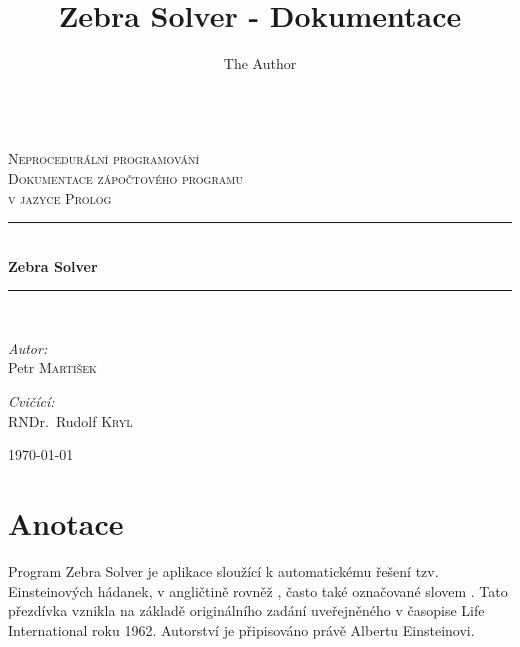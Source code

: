 \documentclass[11pt]{article} %
\title{Zebra Solver - Dokumentace}
\author{The Author}
\date{} %
\begin{document}
\newcommand{\HRule}{\rule{\linewidth}{0.5mm}}
\begin{titlepage}
\begin{center}


~\\[3cm]

\textsc{\LARGE Neprocedurální programování}\\[1.5cm]

\textsc{\Large Dokumentace zápočtového programu \\ v jazyce Prolog}\\[1cm]

\HRule \\ [0.6cm]
{ \huge \bfseries Zebra Solver}\\[0.4cm]

\HRule \\[2.5cm]

\begin{minipage}{0.4\textwidth}
\begin{flushleft} \large
\emph{Autor:}\\
 Petr \textsc{Martišek}
\end{flushleft}
\end{minipage}
\begin{minipage}{0.4\textwidth}
\begin{flushright} \large
\emph{Cvičící:} \\
 RNDr.~Rudolf \textsc{Kryl}
\end{flushright}
\end{minipage}

\vfill

{\large \today}

\end{center}
\end{titlepage}

\section{Anotace}

Program Zebra Solver je aplikace sloužící k automatickému řešení tzv. Einsteinových hádanek, v angličtině rovněž , často také označované slovem . Tato přezdívka vznikla na základě originálního zadání uveřejněného v časopise Life International roku 1962. Autorství je připisováno právě Albertu Einsteinovi.
\end{document}
